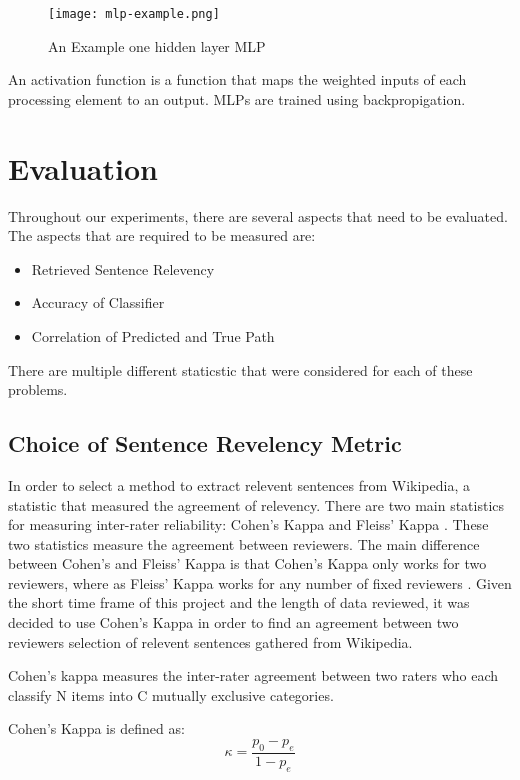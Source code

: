 \documentclass[bsc,frontabs,twoside,singlespacing,parskip,deptreport]{infthesis}     %
\begin{document}
\begin{figure}
  \centering
  \texttt{[image: mlp-example.png]}
  \caption{An Example one hidden layer MLP \cite{scikit-learn}}
  \label{fig:mlp}
\end{figure}

An activation function is a function that maps the weighted inputs of each processing element to an output.
MLPs are trained using backpropigation.

\section{Evaluation}
Throughout our experiments, there are several aspects that need to be evaluated.
The aspects that are required to be measured are:
\begin{itemize}
  \item Retrieved Sentence Relevency
  \item Accuracy of Classifier
  \item Correlation of Predicted and True Path
\end{itemize}

There are multiple different staticstic that were considered for each of these problems.
\subsection{Choice of Sentence Revelency Metric}\label{sec:cohen}
In order to select a method to extract relevent sentences from Wikipedia, a statistic that measured the agreement
of relevency. There are two main statistics for measuring inter-rater reliability: Cohen's Kappa and Fleiss' Kappa \cite{}.
These two statistics measure the agreement between reviewers. The main difference between Cohen's and Fleiss' Kappa is that
Cohen's Kappa only works for two reviewers, where as Fleiss' Kappa works for any number of fixed reviewers \cite{}.
Given the short time frame of this project and the length of data reviewed, it was decided to use Cohen's Kappa in order
to find an agreement between two reviewers selection of relevent sentences gathered from Wikipedia.

Cohen's kappa measures the inter-rater agreement between two raters
who each classify N items into C mutually exclusive categories.

Cohen's Kappa is defined as:\\
\begin{equation}
  \kappa = \frac{p_{0} - p_{e}}{1 - p_{e}}\nonumber
\end{equation}
\end{document}
